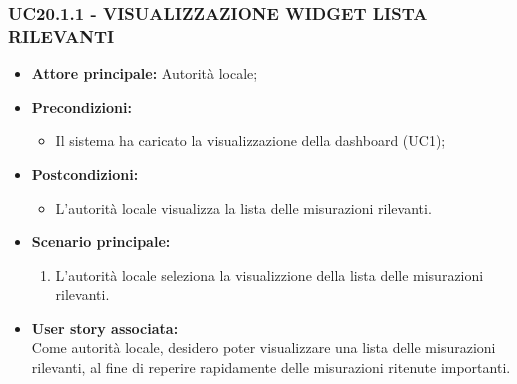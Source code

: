\subsubsection{UC20.1.1 - VISUALIZZAZIONE WIDGET LISTA RILEVANTI}
\begin{itemize}
      \item \textbf{Attore principale:} Autorità locale;
      \item \textbf{Precondizioni:}
            \begin{itemize}
                  \item Il sistema ha caricato la visualizzazione della dashboard (UC1);
            \end{itemize}
      \item \textbf{Postcondizioni:}
            \begin{itemize}
                  \item L'autorità locale visualizza la lista delle misurazioni rilevanti.
            \end{itemize}
      \item \textbf{Scenario principale:}
            \begin{enumerate}
                  \item L'autorità locale seleziona la visualizzione della lista delle misurazioni rilevanti.
            \end{enumerate}
      \item \textbf{User story associata:} \\
      Come autorità locale, desidero poter visualizzare una lista delle misurazioni rilevanti, al fine di reperire rapidamente delle misurazioni ritenute importanti.
\end{itemize}